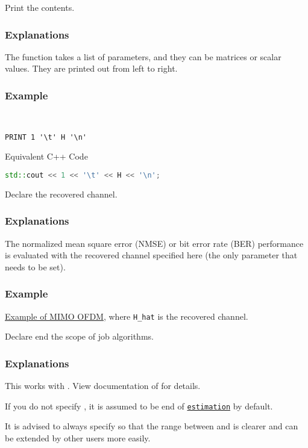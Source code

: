 Print the contents.
\subsubsection*{Explanations}
The function takes a list of parameters,
and they can be matrices or scalar values.
They are printed out from left to right.
\subsubsection*{Example}
\begin{example}~
  \begin{lstlisting}[language=mmcesim-sim]
PRINT 1 '\t' H '\n'
  \end{lstlisting}
  Equivalent C++ Code
  \begin{lstlisting}[language=c++]
std::cout << 1 << '\t' << H << '\n';
  \end{lstlisting}
\end{example}

Declare the recovered channel.
\subsubsection*{Explanations}
The normalized mean square error (NMSE)
or bit error rate (BER) performance
is evaluated with the recovered channel specified here
(the only parameter that needs to be set).
\subsubsection*{Example}
\href{https://github.com/mmcesim/examples/blob/6500ae3021e06b583897f9554e694e86584064f0/MIMO_OFDM_OMP/MIMO_wideband.sim#L110}{Example of MIMO OFDM},
where \texttt{H\_hat} is the recovered channel.

Declare end the scope of job algorithms.
\subsubsection*{Explanations}
This works with .
View documentation of  for details.\par
If you do not specify ,
it is assumed to be end of \hyperref[d:subsec:sim_config_estimation]{\texttt{estimation}}
by default.
\begin{tip}
  It is advised to always specify  so that the range
  between  and  is clearer
  and can be extended by other users more easily.
\end{tip}
